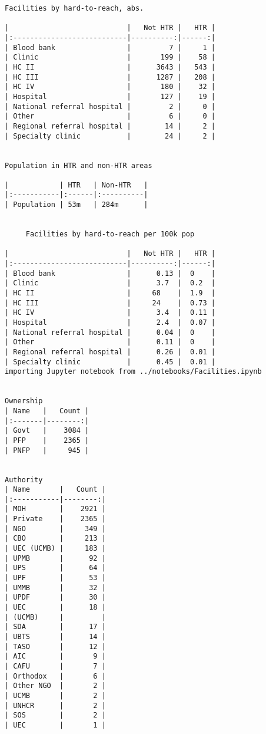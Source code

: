 \documentclass[11pt]{article}
\begin{document}
\begin{Verbatim}[commandchars=\\\{\}]
        Facilities by hard-to-reach, abs.         

|                            |   Not HTR |   HTR |
|:---------------------------|----------:|------:|
| Blood bank                 |         7 |     1 |
| Clinic                     |       199 |    58 |
| HC II                      |      3643 |   543 |
| HC III                     |      1287 |   208 |
| HC IV                      |       180 |    32 |
| Hospital                   |       127 |    19 |
| National referral hospital |         2 |     0 |
| Other                      |         6 |     0 |
| Regional referral hospital |        14 |     2 |
| Specialty clinic           |        24 |     2 |


Population in HTR and non-HTR areas

|            | HTR   | Non-HTR   |
|:-----------|:------|:----------|
| Population | 53m   | 284m      |


     Facilities by hard-to-reach per 100k pop     

|                            |   Not HTR |   HTR |
|:---------------------------|----------:|------:|
| Blood bank                 |      0.13 |  0    |
| Clinic                     |      3.7  |  0.2  |
| HC II                      |     68    |  1.9  |
| HC III                     |     24    |  0.73 |
| HC IV                      |      3.4  |  0.11 |
| Hospital                   |      2.4  |  0.07 |
| National referral hospital |      0.04 |  0    |
| Other                      |      0.11 |  0    |
| Regional referral hospital |      0.26 |  0.01 |
| Specialty clinic           |      0.45 |  0.01 |
importing Jupyter notebook from ../notebooks/Facilities.ipynb


Ownership
| Name   |   Count |
|:-------|--------:|
| Govt   |    3084 |
| PFP    |    2365 |
| PNFP   |     945 |


Authority
| Name       |   Count |
|:-----------|--------:|
| MOH        |    2921 |
| Private    |    2365 |
| NGO        |     349 |
| CBO        |     213 |
| UEC (UCMB) |     183 |
| UPMB       |      92 |
| UPS        |      64 |
| UPF        |      53 |
| UMMB       |      32 |
| UPDF       |      30 |
| UEC        |      18 |
| (UCMB)     |         |
| SDA        |      17 |
| UBTS       |      14 |
| TASO       |      12 |
| AIC        |       9 |
| CAFU       |       7 |
| Orthodox   |       6 |
| Other NGO  |       2 |
| UCMB       |       2 |
| UNHCR      |       2 |
| SOS        |       2 |
| UEC        |       1 |



\end{Verbatim}
\end{document}
